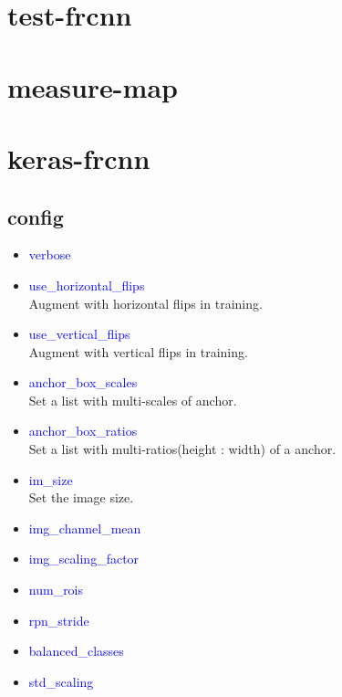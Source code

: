 \documentclass[UTF8,a4paper,11pt]{ctexart}
\begin{document}
\section{test-frcnn}
\section{measure-map}
\section{keras-frcnn}
    \subsection{config}
        \begin{itemize}
            \item {\textcolor{blue}{verbose}} \\
            \item {\textcolor{blue}{use\_horizontal\_flips}} \\
            Augment with horizontal flips in training.
            \item {\textcolor{blue}{use\_vertical\_flips}} \\
            Augment with vertical flips in training.
            \item {\textcolor{blue}{anchor\_box\_scales}} \\
            Set a list with multi-scales of anchor.
            \item {\textcolor{blue}{anchor\_box\_ratios}} \\
            Set a list with multi-ratios(height : width) of a anchor.
            \item {\textcolor{blue}{im\_size}} \\
            Set the image size.
            \item {\textcolor{blue}{img\_channel\_mean}} \\
            \item {\textcolor{blue}{img\_scaling\_factor}} \\
            \item {\textcolor{blue}{num\_rois}} \\
            \item {\textcolor{blue}{rpn\_stride}} \\
            \item {\textcolor{blue}{balanced\_classes}} \\
            \item {\textcolor{blue}{std\_scaling}} \\

\end{itemize}
\end{document}

